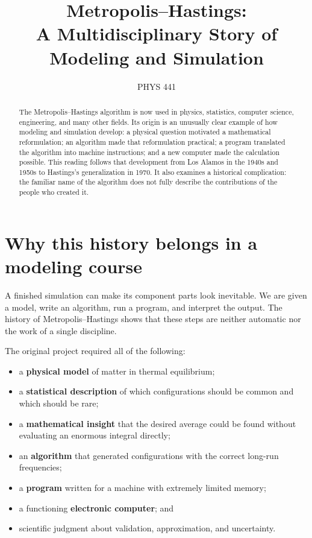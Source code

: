 \documentclass[11pt]{article}
\title{Metropolis--Hastings:\\A Multidisciplinary Story of Modeling and Simulation}
\author{PHYS 441}
\date{}
\begin{document}
\maketitle

\begin{abstract}
The Metropolis--Hastings algorithm is now used in physics, statistics, computer
science, engineering, and many other fields. Its origin is an unusually clear
example of how modeling and simulation develop: a physical question motivated a
mathematical reformulation; an algorithm made that reformulation practical; a
program translated the algorithm into machine instructions; and a new computer
made the calculation possible. This reading follows that development from Los
Alamos in the 1940s and 1950s to Hastings's generalization in 1970. It also
examines a historical complication: the familiar name of the algorithm does not
fully describe the contributions of the people who created it.
\end{abstract}

\section{Why this history belongs in a modeling course}

A finished simulation can make its component parts look inevitable. We are
given a model, write an algorithm, run a program, and interpret the output. The
history of Metropolis--Hastings shows that these steps are neither automatic nor
the work of a single discipline.

The original project required all of the following:

\begin{itemize}
  \item a \textbf{physical model} of matter in thermal equilibrium;
  \item a \textbf{statistical description} of which configurations should be
        common and which should be rare;
  \item a \textbf{mathematical insight} that the desired average could be found
        without evaluating an enormous integral directly;
  \item an \textbf{algorithm} that generated configurations with the correct
        long-run frequencies;
  \item a \textbf{program} written for a machine with extremely limited memory;
  \item a functioning \textbf{electronic computer}; and
  \item scientific judgment about validation, approximation, and uncertainty.
\end{itemize}
\end{document}
